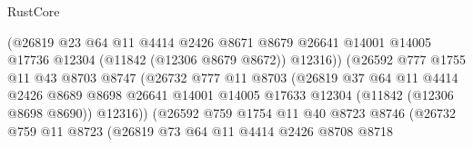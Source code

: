 \begin{lexlean}{RustCore}
\begin{coremodule}
                                  (@26819
                                    @23
                                    @64
                                    @11
                                    @4414
                                    @2426
                                    @8671
                                    @8679
                                    @26641
                                    @14001
                                    @14005
                                    @17736
                                    @12304
                                    (@11842 (@12306 @8679 @8672))
                                    @12316))
                                (@26592
                                  @777
                                  @1755
                                  @11
                                  @43
                                  @8703
                                  @8747
                                  (@26732
                                    @777
                                    @11
                                    @8703
                                    (@26819
                                      @37
                                      @64
                                      @11
                                      @4414
                                      @2426
                                      @8689
                                      @8698
                                      @26641
                                      @14001
                                      @14005
                                      @17633
                                      @12304
                                      (@11842 (@12306 @8698 @8690))
                                      @12316))
                                  (@26592
                                    @759
                                    @1754
                                    @11
                                    @40
                                    @8723
                                    @8746
                                    (@26732
                                      @759
                                      @11
                                      @8723
                                      (@26819
                                        @73
                                        @64
                                        @11
                                        @4414
                                        @2426
                                        @8708
                                        @8718

\end{coremodule}
\end{lexlean}
